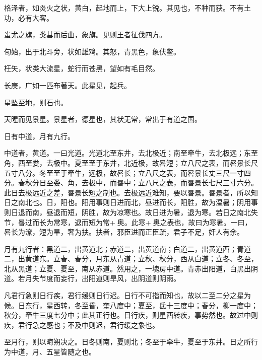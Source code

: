 \documentclass[12pt,UTF8]{ctexbook}
\begin{document}
格泽者，如炎火之状，黄白，起地而上，下大上锐。其见也，不种而获。不有土功，必有大客。



蚩尤之旗，类彗而后曲，象旗。见则王者征伐四方。



旬始，出于北斗旁，状如雄鸡。其怒，青黑色，象伏鳖。



枉矢，状类大流星，蛇行而苍黑，望如有毛目然。



长庚，广如一匹布著天。此星见，起兵。



星坠至地，则石也。



天暒而见景星。景星者，德星也，其状无常，常出于有道之国。



日有中道，月有九行。



中道者，黄道。一曰光道。光道北至东井，去北极近；南至牵牛，去北极远；东至角，西至娄，去极中。夏至至于东井，北近极，故晷短；立八尺之表，而晷景长尺五寸八分。冬至至于牵牛，远极，故晷长；立八尺之表，而晷景长丈三尺一寸四分。春秋分日至娄、角，去极中，而晷中；立八尺之表，而晷景长七尺三寸六分。此日去极远近之差，晷景长短之制也。去极远近难知，要以晷景。晷景者，所以知日之南北也。日，阳也。阳用事则日进而北，昼进而长，阳胜，故为温暑；阴用事则日退而南，昼退而短，阴胜，故为凉寒也。故日进为暑，退为寒。若日之南北失节，晷过而长为常寒，退而短为常+奥。此寒+奥之表也，故曰为寒暑。一曰，晷长为潦，短为旱，奢为扶。扶者，邪臣进而正臣疏，君子不足，奸人有余。



月有九行者：黑道二，出黄道北；赤道二，出黄道南；白道二，出黄道西；青道二，出黄道东。立春、春分，月东从青道；立秋、秋分，西从白道；立冬、冬至，北从黑道；立夏、夏至，南从赤道。然用之，一塊房中道。青赤出阳道，白黑出阴道。若月失节度而妄行，出阳道则旱风，出阴道则阴雨。



凡君行急则日行疾，君行缓则日行迟。日行不可指而知也，故以二至二分之星为候。日东行，星西转，冬至昏，奎八度中；夏至，氐十三度中；春分，柳一度中；秋分，牵牛三度七分中；此其正行也。日行疾，则星西转疾，事势然也。故过中则疾，君行急之感也；不及中则迟，君行缓之象也。



至月行，则以晦朔决之。日冬则南，夏则北；冬至于牵牛，夏至于东井。日之所行为中道，月、五星皆随之也。
\end{document}
